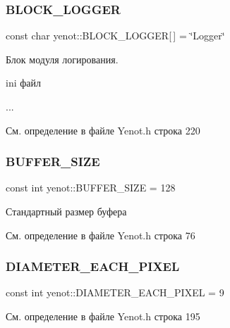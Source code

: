 \subsubsection{\texorpdfstring{B\+L\+O\+C\+K\+\_\+\+L\+O\+G\+G\+ER}{BLOCK\_LOGGER}}
{\footnotesize\ttfamily const char yenot\+::\+B\+L\+O\+C\+K\+\_\+\+L\+O\+G\+G\+ER\mbox{[}$\,$\mbox{]} = \char`\"{}Logger\char`\"{}}

Блок модуля логирования.

ini файл 
\begin{DoxyCode}
[Logger]
...
\end{DoxyCode}
 

См. определение в файле Yenot.\+h строка 220

\mbox{\label{namespaceyenot_a08846c7b8addedd4db68b5cf3721bda1}} 
\subsubsection{\texorpdfstring{B\+U\+F\+F\+E\+R\+\_\+\+S\+I\+ZE}{BUFFER\_SIZE}}
{\footnotesize\ttfamily const int yenot\+::\+B\+U\+F\+F\+E\+R\+\_\+\+S\+I\+ZE = 128}



Стандартный размер буфера 



См. определение в файле Yenot.\+h строка 76

\mbox{\label{namespaceyenot_ad85720cad8409ab5ef5cc47afc84645c}} 
\subsubsection{\texorpdfstring{D\+I\+A\+M\+E\+T\+E\+R\+\_\+\+E\+A\+C\+H\+\_\+\+P\+I\+X\+EL}{DIAMETER\_EACH\_PIXEL}}
{\footnotesize\ttfamily const int yenot\+::\+D\+I\+A\+M\+E\+T\+E\+R\+\_\+\+E\+A\+C\+H\+\_\+\+P\+I\+X\+EL = 9}



См. определение в файле Yenot.\+h строка 195

